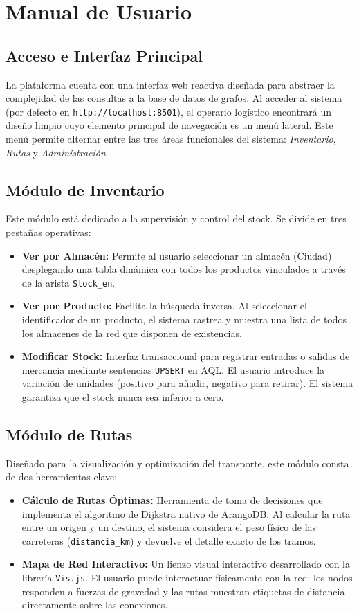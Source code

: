 \chapter{Manual de Usuario}

\section{Acceso e Interfaz Principal}
La plataforma cuenta con una interfaz web reactiva diseñada para abstraer la complejidad de las consultas a la base de datos de grafos. Al acceder al sistema (por defecto en \texttt{http://localhost:8501}), el operario logístico encontrará un diseño limpio cuyo elemento principal de navegación es un menú lateral. Este menú permite alternar entre las tres áreas funcionales del sistema: \textit{Inventario}, \textit{Rutas} y \textit{Administración}.

\section{Módulo de Inventario}
Este módulo está dedicado a la supervisión y control del stock. Se divide en tres pestañas operativas:
\begin{itemize}
    \item \textbf{Ver por Almacén:} Permite al usuario seleccionar un almacén (Ciudad) desplegando una tabla dinámica con todos los productos vinculados a través de la arista \texttt{Stock\_en}.
    \item \textbf{Ver por Producto:} Facilita la búsqueda inversa. Al seleccionar el identificador de un producto, el sistema rastrea y muestra una lista de todos los almacenes de la red que disponen de existencias.
    \item \textbf{Modificar Stock:} Interfaz transaccional para registrar entradas o salidas de mercancía mediante sentencias \texttt{UPSERT} en AQL. El usuario introduce la variación de unidades (positivo para añadir, negativo para retirar). El sistema garantiza que el stock nunca sea inferior a cero.
\end{itemize}

\section{Módulo de Rutas}
Diseñado para la visualización y optimización del transporte, este módulo consta de dos herramientas clave:
\begin{itemize}
    \item \textbf{Cálculo de Rutas Óptimas:} Herramienta de toma de decisiones que implementa el algoritmo de Dijkstra nativo de ArangoDB. Al calcular la ruta entre un origen y un destino, el sistema considera el peso físico de las carreteras (\texttt{distancia\_km}) y devuelve el detalle exacto de los tramos.
    \item \textbf{Mapa de Red Interactivo:} Un lienzo visual interactivo desarrollado con la librería \texttt{Vis.js}. El usuario puede interactuar físicamente con la red: los nodos responden a fuerzas de gravedad y las rutas muestran etiquetas de distancia directamente sobre las conexiones.
\end{itemize}

